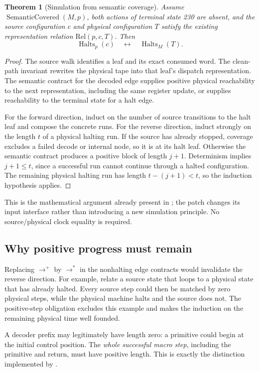 \documentclass[11pt,letterpaper]{article}
\newcommand{\code}[1]{\texttt{\small\detokenize{#1}}}
\newcommand{\Halts}{\operatorname{Halts}}
\newcommand{\SemCov}{\operatorname{SemanticCovered}}
\newtheorem{theorem}{Theorem}[section]
\theoremstyle{definition}\newtheorem{definition}[theorem]{Definition}
\begin{document}
\begin{theorem}[Simulation from semantic coverage]
Assume \(\SemCov(M,p)\), both actions of terminal state 230 are absent, and
the source configuration \(c\) and physical configuration \(T\) satisfy the
existing representation relation \(\mathrm{Rel}(p,c,T)\). Then
\[
       \Halts_p(c)\quad\longleftrightarrow\quad\Halts_M(T).
\]
\end{theorem}
\begin{proof}
The source walk identifies a leaf and its exact consumed word. The clean-path
invariant rewrites the physical tape into that leaf's dispatch representation.
The semantic contract for the decoded edge supplies positive physical
reachability to the next representation, including the same register update,
or supplies reachability to the terminal state for a halt edge.

For the forward direction, induct on the number of source transitions to the
halt leaf and compose the concrete runs. For the reverse direction, induct
strongly on the length \(t\) of a physical halting run. If the source has
already stopped, coverage excludes a failed decode or internal node, so it is
at its halt leaf. Otherwise the semantic contract produces a positive block
of length \(j+1\). Determinism implies \(j+1\le t\), since a successful
run cannot continue through a halted configuration. The remaining physical
halting run has length \(t-(j+1)<t\), so the induction hypothesis applies.
\end{proof}

This is the mathematical argument already present in \code{KSim}; the patch
changes its input interface rather than introducing a new simulation principle.
No source/physical clock equality is required.

\subsection{Why positive progress must remain}

Replacing \(\longrightarrow^+\) by \(\longrightarrow^*\) in the nonhalting
edge contracts would invalidate the reverse direction. For example, relate a
source state that loops to a physical state that has already halted. Every
source step could then be matched by zero physical steps, while the physical
machine halts and the source does not. The positive-step obligation excludes
this example and makes the induction on the remaining physical time well founded.

A decoder prefix may legitimately have length zero: a primitive could begin
at the initial control position. The \emph{whole successful macro step},
including the primitive and return, must have positive length. This is exactly
the distinction implemented by \code{PortContract.precompose}.
\end{document}
